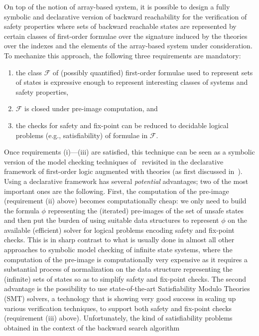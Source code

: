 \documentclass{LMCS}
\theoremstyle{plain}\newtheorem{assumption}[thm]{Assumption}
\theoremstyle{plain}\newtheorem{proposition}[thm]{Proposition}
\theoremstyle{plain}\newtheorem{property}[thm]{Property}
\theoremstyle{plain}\newtheorem{example}[thm]{Example}
\theoremstyle{plain}\newtheorem{claim}[thm]{Claim}
\theoremstyle{plain}\newtheorem{lemma}[thm]{Lemma}
\begin{document}
On top of the notion of array-based system, it is possible to design a
fully symbolic and declarative version of backward reachability for
the verification of safety properties where sets of backward reachable
states are represented by certain classes of first-order formulae over
the signature induced by the theories over the indexes and the
elements of the array-based system under consideration.  To mechanize
this approach, the following three requirements are mandatory:
\begin{enumerate}[{\rm (i)}]
\item the class $\mathcal{F}$ of (possibly quantified) first-order
  formulae used to represent sets of states is expressive enough to
  represent interesting classes of systems and safety properties,
\item $\mathcal{F}$ is closed under pre-image computation, and
\item the checks for safety and fix-point can be reduced to decidable
  logical problems (e.g., satisfiability) of formulae in
  $\mathcal{F}$.
\end{enumerate}
Once requirements (i)---(iii) are satisfied, this technique can be
seen as a symbolic version of the model checking techniques
of~\cite{lics} revisited in the declarative framework of first-order
logic augmented with theories (as first discussed in~\cite{ijcar08}).
Using a declarative framework has several \emph{potential} advantages;
two of the most important ones are the following.  First, the
computation of the pre-image (requirement (ii) above) becomes
computationally cheap: we only need to build the formula $\phi$
representing the (iterated) pre-images of the set of unsafe states and
then put the burden of using suitable data structures to represent
$\phi$ on the available (efficient) solver for logical problems
encoding safety and fix-point checks.  This is in sharp contrast to
what is usually done in almost all other approaches to symbolic model
checking of infinite state systems, where the computation of the
pre-image is computationally very expensive as it requires a
substantial process of normalization on the data structure
representing the (infinite) sets of states so as to simplify safety
and fix-point checks.  The second advantage is the possibility to use
state-of-the-art Satisfiability Modulo Theories (SMT) solvers, a
technology that is showing very good success in scaling up various
verification techniques, to support both safety and fix-point checks
(requirement (iii) above).  Unfortunately, the kind of satisfiability
problems obtained in the context of the backward search algorithm
\end{document}
